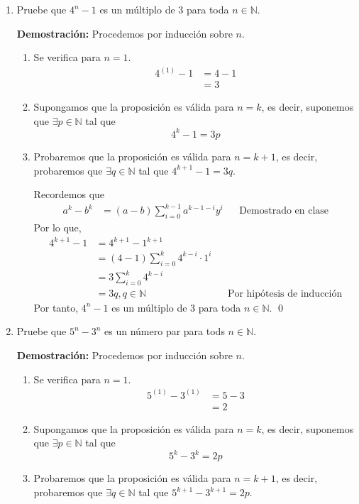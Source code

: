 \documentclass[11pt]{article}
\newcommand{\N}{\mathbb{N}}
\begin{document}
\begin{enumerate}
  \pagebreak

  \item Pruebe que $4^n-1$ es un múltiplo de $3$ para toda $n\in \N$.
  
  \textbf{Demostración:} Procedemos por inducción sobre $n$. \begin{enumerate}[label=\roman*)]
   \item Se verifica para $n=1$. \begin{align*}
    4^{(1)}-1 &= 4-1 \\
    &= 3
   \end{align*}
   \item Supongamos que la proposición es válida para $n=k$, es decir, suponemos que $\exists p\in \N$ tal que \[4^k-1=3p\]
   \item Probaremos que la proposición es válida para $n=k+1$, es decir, probaremos que $\exists q \in \N$ tal que $4^{k+1}-1=3q$.
   
   Recordemos que \begin{align*}
    a^k-b^k &= (a-b)\sum_{i=0}^{k-1} a^{k-1-i}y^{i} && \text{Demostrado en clase}
   \end{align*}
   Por lo que,
   \begin{align*}
    4^{k+1}-1 &= 4^{k+1}-1^{k+1}\\
    &= (4-1)\sum_{i=0}^{k} 4^{k-i} \cdot 1^{i}\\
    &= 3 \sum_{i=0}^{k} 4^{k-i}\\
    &= 3 q, q \in \N && \text{Por hipótesis	de inducción}
   \end{align*}
   Por tanto, $4^n-1$ es un múltiplo de $3$ para toda $n\in \N$. \qed
  \end{enumerate}

 \item Pruebe que $5^n-3^n$ es un número par para tods $n\in \N$.
 
 \textbf{Demostración:} Procedemos por inducción sobre $n$. \begin{enumerate}[label=\roman*)]
  \item Se verifica para $n=1$. \begin{align*}
   5^{(1)}-3^{(1)} &= 5-3 \\
   &= 2
  \end{align*}
  \item Supongamos que la proposición es válida para $n=k$, es decir, suponemos que $\exists p\in \N$ tal que \[5^k-3^k=2p\]
  \item Probaremos que la proposición es válida para $n=k+1$, es decir, probaremos que $\exists q \in \N$ tal que $5^{k+1}-3^{k+1}=2p$.
  

\end{enumerate}
\end{enumerate}
\end{document}
